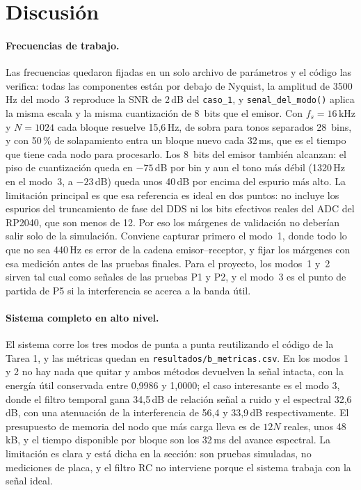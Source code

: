 
\section{Discusión}
\label{sec:discusion}

\paragraph{Frecuencias de trabajo.} Las frecuencias quedaron fijadas en un solo
archivo de parámetros y el código las verifica: todas las componentes están por
debajo de Nyquist, la amplitud de 3500\,Hz del modo~3 reproduce la SNR de 2\,dB
del \texttt{caso\_1}, y \texttt{senal\_del\_modo()} aplica la misma escala y la
misma cuantización de 8~bits que el emisor. Con $f_s = 16$\,kHz y $N = 1024$
cada bloque resuelve 15,6\,Hz, de sobra para tonos separados 28~bins, y con
50\,\% de solapamiento entra un bloque nuevo cada 32\,ms, que es el tiempo que
tiene cada nodo para procesarlo. Los 8~bits del emisor también alcanzan: el piso
de cuantización queda en $-75$\,dB por bin y aun el tono más débil (1320\,Hz en
el modo~3, a $-23$\,dB) queda unos 40\,dB por encima del espurio más alto. La
limitación principal es que esa
referencia es ideal en dos puntos: no incluye los espurios del truncamiento de
fase del DDS ni los bits efectivos reales del ADC del RP2040, que son menos de
12. Por eso los márgenes de validación no deberían salir solo de la simulación.
Conviene capturar primero el modo~1, donde todo lo que no sea 440\,Hz es error
de la cadena emisor--receptor, y fijar los márgenes con esa medición antes de
las pruebas finales. Para el proyecto, los modos~1 y~2 sirven tal cual como
señales de las pruebas P1 y P2, y el modo~3 es el punto de partida de P5 si la
interferencia se acerca a la banda útil.

\paragraph{Sistema completo en alto nivel.} El sistema corre los tres modos de
punta a punta reutilizando el código de la Tarea 1, y las métricas quedan en
\texttt{resultados/b\_metricas.csv}. En los modos 1 y 2 no hay nada que quitar y
ambos métodos devuelven la señal intacta, con la energía útil conservada entre
0,9986 y 1,0000; el caso interesante es el modo 3, donde el filtro temporal gana
34,5\,dB de relación señal a ruido y el espectral 32,6\,dB, con una atenuación de
la interferencia de 56,4 y 33,9\,dB respectivamente. El presupuesto de memoria del
nodo que más carga lleva es de $12N$ reales, unos 48\,kB, y el tiempo disponible
por bloque son los 32\,ms del avance espectral. La limitación es clara y está
dicha en la sección: son pruebas simuladas, no mediciones de placa, y el filtro RC
no interviene porque el sistema trabaja con la señal ideal.


